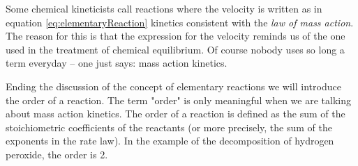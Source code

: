 Some chemical kineticists call reactions where the velocity is written as in equation \ref{eq:elementaryReaction} kinetics consistent with the \textit{law of mass action}. The reason for this is that the expression for the velocity reminds us of the one used in the treatment of chemical equilibrium. Of course nobody uses so long a term everyday -- one just says: mass action kinetics.

Ending the discussion of the concept of elementary reactions we will introduce the order of a reaction. The term "order" is only meaningful when we are talking about mass action kinetics. The order of a reaction is defined as the sum of the stoichiometric coefficients of the reactants (or more precisely, the sum of the exponents in the rate law). In the example of the decomposition of hydrogen peroxide, the order is 2.